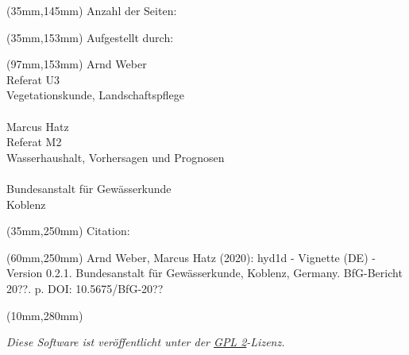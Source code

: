 \begin{titlepage}
    \begin{textblock*}{150mm}(35mm,145mm)
    \fontsize{15}{17}\selectfont\noindent
    Anzahl der Seiten: \pageref{LastPage}
    \end{textblock*}

    \begin{textblock*}{150mm}(35mm,153mm)
    \fontsize{15}{17}\selectfont\noindent
    Aufgestellt durch:
    \end{textblock*}

    \begin{textblock*}{85mm}(97mm,153mm)
    \fontsize{15}{17}\selectfont\noindent
    Arnd Weber \\
    Referat U3 \\
    Vegetationskunde, Landschaftspflege \\
    \\
    Marcus Hatz \\
    Referat M2 \\
    Wasserhaushalt, Vorhersagen und Prognosen \\
    \\
    Bundesanstalt für Gewässerkunde \\
    Koblenz \\
    \end{textblock*}

    \begin{textblock*}{150mm}(35mm,250mm)
    \fontsize{10}{12}\selectfont\noindent
    Citation:
    \end{textblock*}

    \begin{textblock*}{120mm}(60mm,250mm)
    \fontsize{10}{12}\selectfont\noindent
    Arnd Weber, Marcus Hatz (2020): hyd1d - Vignette (DE) - Version 0.2.1. Bundesanstalt für Gewässerkunde, Koblenz, Germany. BfG-Bericht 20??. \pageref*{LastPage} p. DOI: 10.5675/BfG-20??
    \end{textblock*}

    \begin{textblock*}{190mm}(10mm,280mm)
    \fontsize{8}{9}\selectfont\noindent
    \begin{center}
    \textit{Diese Software ist veröffentlicht unter der \href{https://www.gnu.org/licenses/gpl-2.0}{GPL 2}-Lizenz.}
    \end{center}
    \end{textblock*}
    ~
\end{titlepage}

\newpage


